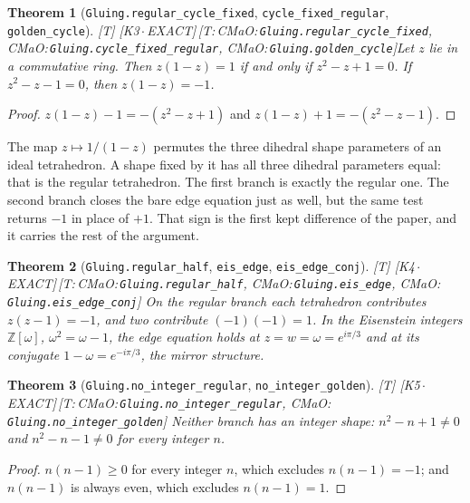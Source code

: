 \documentclass[11pt]{article}
\newtheorem{theorem}{Theorem}
\theoremstyle{definition}
\newcommand{\grade}[1]{\textsf{\small[#1]}}
\newcommand{\lean}[1]{\texttt{\small #1}}
\newcommand{\dtag}[1]{#1}
\begin{document}
\begin{theorem}[\lean{Gluing.regular\_cycle\_fixed}, \lean{cycle\_fixed\_regular}, \lean{golden\_cycle}]\grade{T}\dtag{ \textsf{\small[K3\,$\cdot$\,EXACT]}\,\textsf{\small[T:\,CMaO:\,\lean{Gluing.\allowbreak{}regular\_\allowbreak{}cycle\_\allowbreak{}fixed}, CMaO:\,\lean{Gluing.\allowbreak{}cycle\_\allowbreak{}fixed\_\allowbreak{}regular}, CMaO:\,\lean{Gluing.\allowbreak{}golden\_\allowbreak{}cycle}]}}\dtag{\label{thm:regshape-ref}}
Let $z$ lie in a commutative ring. Then $z(1-z)=1$ if and only if $z^2-z+1=0$. If $z^2-z-1=0$, then $z(1-z)=-1$.
\end{theorem}
\begin{proof}
$z(1-z)-1=-(z^2-z+1)$ and $z(1-z)+1=-(z^2-z-1)$.
\end{proof}

The map $z\mapsto 1/(1-z)$ permutes the three dihedral shape parameters of an ideal tetrahedron. A shape fixed by it has all three dihedral parameters equal: that is the regular tetrahedron. The first branch is exactly the regular one. The second branch closes the bare edge equation just as well, but the same test returns $-1$ in place of $+1$. That sign is the first kept difference of the paper, and it carries the rest of the argument.

\begin{theorem}[\lean{Gluing.regular\_half}, \lean{eis\_edge}, \lean{eis\_edge\_conj}]\grade{T}\dtag{ \textsf{\small[K4\,$\cdot$\,EXACT]}\,\textsf{\small[T:\,CMaO:\,\lean{Gluing.\allowbreak{}regular\_\allowbreak{}half}, CMaO:\,\lean{Gluing.\allowbreak{}eis\_\allowbreak{}edge}, CMaO:\,\lean{Gluing.\allowbreak{}eis\_\allowbreak{}edge\_\allowbreak{}conj}]}}
On the regular branch each tetrahedron contributes $z(z-1)=-1$, and two contribute $(-1)(-1)=1$. In the Eisenstein integers $\mathbb Z[\omega]$, $\omega^2=\omega-1$, the edge equation holds at $z=w=\omega=e^{i\pi/3}$ and at its conjugate $1-\omega=e^{-i\pi/3}$, the mirror structure.
\end{theorem}

\begin{theorem}[\lean{Gluing.no\_integer\_regular}, \lean{no\_integer\_golden}]\grade{T}\dtag{ \textsf{\small[K5\,$\cdot$\,EXACT]}\,\textsf{\small[T:\,CMaO:\,\lean{Gluing.\allowbreak{}no\_\allowbreak{}integer\_\allowbreak{}regular}, CMaO:\,\lean{Gluing.\allowbreak{}no\_\allowbreak{}integer\_\allowbreak{}golden}]}}
Neither branch has an integer shape: $n^2-n+1\neq0$ and $n^2-n-1\neq0$ for every integer $n$.
\end{theorem}
\begin{proof}
$n(n-1)\ge 0$ for every integer $n$, which excludes $n(n-1)=-1$; and $n(n-1)$ is always even, which excludes $n(n-1)=1$.
\end{proof}
\end{document}
